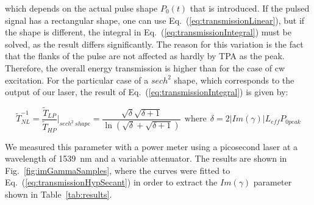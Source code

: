 \documentclass[10pt,letterpaper]{article}
\begin{document}
which depends on the actual pulse shape $P_{0}(t)$ that is introduced. If the pulsed signal has a rectangular shape, one can use Eq.~(\ref{eq:transmissionLinear}), but if the shape is different, the integral in Eq.~(\ref{eq:transmissionIntegral}) must be solved, as the result differs significantly. The reason for this variation is the fact that the flanks of the pulse are not affected as hardly by TPA as the peak. Therefore, the overall energy transmission is higher than for the case of cw excitation. For the particular case of a $sech^2$ shape, which corresponds to the output of our laser, the result of  Eq.~(\ref{eq:transmissionIntegral}) is given by:






\begin{equation}
\tilde{T}_{NL}^{-1} = \frac{\tilde{T}_{LP}}{\tilde{T}_{HP}} \bigg|_{sech^2~shape}  = \frac{\sqrt{\delta}\sqrt{\delta + 1}}{\ln(\sqrt{\delta}+\sqrt{\delta+1})} ~~\mathrm{where}~~  \delta = 2|Im(\gamma)| L_{eff} P_{0 peak}
\label{eq:transmissionHypSecant}
\end{equation}



We measured this parameter with a power meter using a picosecond laser at a wavelength of 1539~nm and a variable attenuator. The results are shown in Fig.~\ref{fig:imGammaSamples}, where the curves were fitted to Eq.~(\ref{eq:transmissionHypSecant}) in order to extract the $Im(\gamma)$ parameter shown in Table~\ref{tab:results}.
\end{document}
